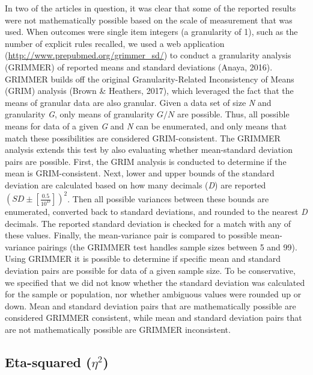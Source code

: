 \documentclass[
  english,
  man,floatsintext]{apa7}
\begin{document}
In two of the articles in question, it was clear that some of the reported results were not mathematically possible based on the scale of measurement that was used. When outcomes were single item integers (a granularity of 1), such as the number of explicit rules recalled, we used a web application (\url{http://www.prepubmed.org/grimmer_sd/}) to conduct a granularity analysis (GRIMMER) of reported means and standard deviations (Anaya, 2016). GRIMMER builds off the original Granularity-Related Inconsistency of Means (GRIM) analysis (Brown \& Heathers, 2017), which leveraged the fact that the means of granular data are also granular. Given a data set of size \emph{N} and granularity \emph{G}, only means of granularity \(G/N\) are possible. Thus, all possible means for data of a given \emph{G} and \emph{N} can be enumerated, and only means that match these possibilities are considered GRIM-consistent. The GRIMMER analysis extends this test by also evaluating whether mean-standard deviation pairs are possible. First, the GRIM analysis is conducted to determine if the mean is GRIM-consistent. Next, lower and upper bounds of the standard deviation are calculated based on how many decimals (\emph{D}) are reported \((SD\pm[\frac{0.5}{10^{D}}])^{2}\). Then all possible variances between these bounds are enumerated, converted back to standard deviations, and rounded to the nearest \emph{D} decimals. The reported standard deviation is checked for a match with any of these values. Finally, the mean-variance pair is compared to possible mean-variance pairings (the GRIMMER test handles sample sizes between 5 and 99). Using GRIMMER it is possible to determine if specific mean and standard deviation pairs are possible for data of a given sample size. To be conservative, we specified that we did not know whether the standard deviation was calculated for the sample or population, nor whether ambiguous values were rounded up or down. Mean and standard deviation pairs that are mathematically possible are considered GRIMMER consistent, while mean and standard deviation pairs that are not mathematically possible are GRIMMER inconsistent.

\hypertarget{eta-squared-eta2}{%
\subsection{\texorpdfstring{Eta-squared (\(\eta^{2}\))}{Eta-squared (\textbackslash eta\^{}\{2\})}}\label{eta-squared-eta2}}
\end{document}

